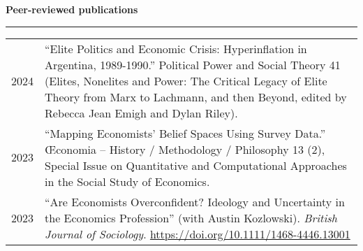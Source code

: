 \documentclass[12pt,letterpaper]{article}
\newcommand{\sectionhead}[1]{\begin{flushleft}\large\bf{#1}\vspace{.1cm}\hrule\end{flushleft}}
\begin{document}
\sectionhead{Peer-reviewed publications}
\begin{tabulary}{.97\textwidth}{@{}p{2.5cm}  L}
2024 & ``Elite Politics and Economic Crisis: Hyperinflation in Argentina, 1989-1990.'' Political Power and Social Theory 41 (Elites, Nonelites and Power: The Critical Legacy of Elite Theory from Marx to Lachmann, and then Beyond, edited by Rebecca Jean Emigh and Dylan Riley).	\\
2023 & ``Mapping Economists' Belief Spaces Using Survey Data.''  \OE conomia -- History / Methodology / Philosophy 13 (2), Special Issue on Quantitative and Computational Approaches in the Social Study of Economics.	\\
2023 & ``Are Economists Overconfident? Ideology and Uncertainty in the Economics Profession'' (with Austin Kozlowski).  \textit{British Journal of Sociology}.  \url{https://doi.org/10.1111/1468-4446.13001}\\
\end{tabulary}
\end{document}
